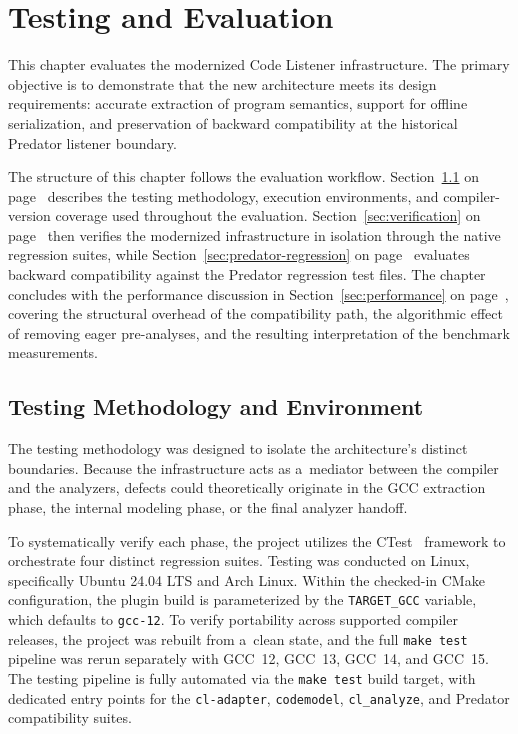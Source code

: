 \documentclass[xpsejal00-gcc-plugin.tex]{subfiles}
\begin{document}
\chapter{Testing and Evaluation}\label{chap:testing}

This chapter evaluates the modernized Code Listener infrastructure.
The primary objective is to demonstrate that the new architecture meets its design requirements: accurate extraction of program semantics, support for offline serialization, and preservation of backward compatibility at the historical Predator listener boundary.

The structure of this chapter follows the evaluation workflow.
Section~\ref{sec:testing-methodology} on page~\pageref{sec:testing-methodology} describes the testing methodology, execution environments, and compiler-version coverage used throughout the evaluation.
Section~\ref{sec:verification} on page~\pageref{sec:verification} then verifies the modernized infrastructure in isolation through the native regression suites, while Section~\ref{sec:predator-regression} on page~\pageref{sec:predator-regression} evaluates backward compatibility against the Predator regression test files.
The chapter concludes with the performance discussion in Section~\ref{sec:performance} on page~\pageref{sec:performance}, covering the structural overhead of the compatibility path, the algorithmic effect of removing eager pre-analyses, and the resulting interpretation of the benchmark measurements.

\section{Testing Methodology and Environment}\label{sec:testing-methodology}

The testing methodology was designed to isolate the architecture's distinct boundaries.
Because the infrastructure acts as a~mediator between the compiler and the analyzers, defects could theoretically originate in the GCC extraction phase, the internal modeling phase, or the final analyzer handoff.

To systematically verify each phase, the project utilizes the CTest~\cite{CMake} framework to orchestrate four distinct regression suites.
Testing was conducted on Linux, specifically Ubuntu 24.04 LTS and Arch Linux.
Within the checked-in CMake configuration, the plugin build is parameterized by the \texttt{TARGET\_GCC} variable, which defaults to \texttt{gcc-12}.
To verify portability across supported compiler releases, the project was rebuilt from a~clean state, and the full \texttt{make test} pipeline was rerun separately with GCC~12, GCC~13, GCC~14, and GCC~15.
The testing pipeline is fully automated via the \texttt{make test} build target, with dedicated entry points for the \texttt{cl-adapter}, \texttt{codemodel}, \texttt{cl\_analyze}, and Predator compatibility suites.
\end{document}
